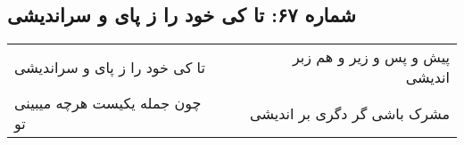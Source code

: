 \begin{center}
\section*{شماره ۶۷: تا کی خود را ز پای و سراندیشی}
\label{sec:067}
\begin{longtable}{l p{0.5cm} r}
تا کی خود را ز پای و سراندیشی
&&
پیش و پس و زیر و هم زبر اندیشی
\\
چون جمله یکیست هرچه میبینی تو
&&
مشرک باشی گر دگری بر اندیشی
\\
\end{longtable}
\end{center}
